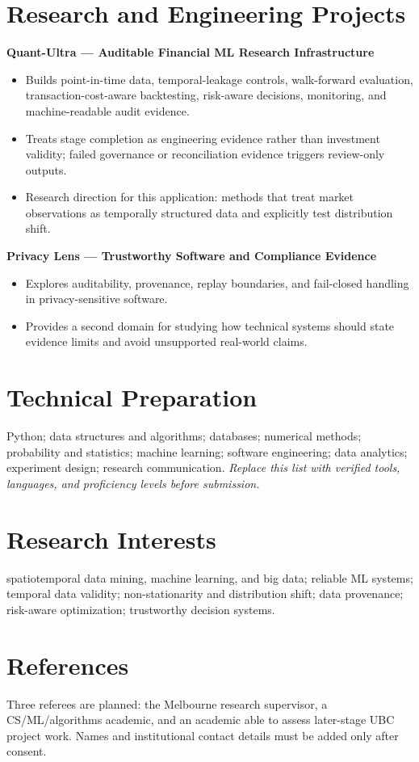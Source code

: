 \documentclass[11pt]{article}
\begin{document}
\section*{Research and Engineering Projects}
\textbf{Quant-Ultra --- Auditable Financial ML Research Infrastructure}
\begin{itemize}
\item Builds point-in-time data, temporal-leakage controls, walk-forward evaluation, transaction-cost-aware backtesting, risk-aware decisions, monitoring, and machine-readable audit evidence.
\item Treats stage completion as engineering evidence rather than investment validity; failed governance or reconciliation evidence triggers review-only outputs.
\item Research direction for this application: methods that treat market observations as temporally structured data and explicitly test distribution shift.
\end{itemize}

\textbf{Privacy Lens --- Trustworthy Software and Compliance Evidence}
\begin{itemize}
\item Explores auditability, provenance, replay boundaries, and fail-closed handling in privacy-sensitive software.
\item Provides a second domain for studying how technical systems should state evidence limits and avoid unsupported real-world claims.
\end{itemize}

\section*{Technical Preparation}
Python; data structures and algorithms; databases; numerical methods; probability and statistics; machine learning; software engineering; data analytics; experiment design; research communication. \textit{Replace this list with verified tools, languages, and proficiency levels before submission.}

\section*{Research Interests}
spatiotemporal data mining, machine learning, and big data; reliable ML systems; temporal data validity; non-stationarity and distribution shift; data provenance; risk-aware optimization; trustworthy decision systems.

\section*{References}
Three referees are planned: the Melbourne research supervisor, a CS/ML/algorithms academic, and an academic able to assess later-stage UBC project work. Names and institutional contact details must be added only after consent.
\end{document}

